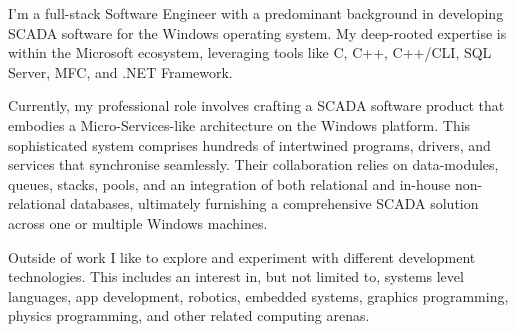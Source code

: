\documentclass[9pt]{developercv} %
\begin{document}
\vspace{0.5cm}


\begin{minipage}[t]{1\textwidth} %


	I'm a full-stack Software Engineer with a predominant background in developing SCADA software for the Windows operating system. My deep-rooted expertise is within the Microsoft ecosystem, leveraging tools like C, C++, C++/CLI, SQL Server, MFC, and .NET Framework.

	\vspace{0.5cm}	

	Currently, my professional role involves crafting a SCADA software product that embodies a Micro-Services-like architecture on the Windows platform. This sophisticated system comprises hundreds of intertwined programs, drivers, and services that synchronise seamlessly. Their collaboration relies on data-modules, queues, stacks, pools, and an integration of both relational and in-house non-relational databases, ultimately furnishing a comprehensive SCADA solution across one or multiple Windows machines.
	
	\vspace{0.5cm}	

	Outside of work I like to explore and experiment with different development technologies. This includes an interest in, but not limited to, systems level languages, app development, robotics, embedded systems, graphics programming, physics programming, and other related computing arenas.

\end{minipage}

\vspace{1cm}	



\end{document}
